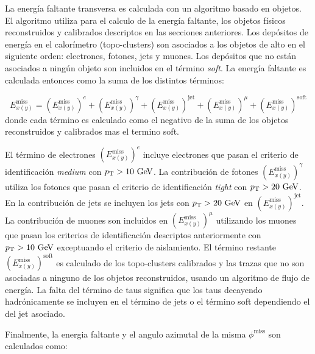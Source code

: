 La energía faltante transversa es calculada con un algoritmo basado en objetos.
El algoritmo utiliza para el calculo de la energía faltante, los objetos físicos
reconstruidos y calibrados descriptos en las secciones anteriores. Los depósitos
de energía en el calorímetro (topo-clusters) son asociados a los objetos de alto
{\pt} en el siguiente orden: electrones, fotones, jets y muones. Los depósitos
que no están asociados a ningún objeto son incluidos en el término \emph{soft}.
La energía faltante es calculada entonces como la suma de los distintos
términos:

\begin{equation}
  E^{\mathrm{miss}}_{x(y)} = (E^{\mathrm{miss}}_{x(y)})^e + (E^{\mathrm{miss}}_{x(y)})^\gamma + (E^{\mathrm{miss}}_{x(y)})^{\text{jet}} + (E^{\mathrm{miss}}_{x(y)})^{\mu} + (E^{\mathrm{miss}}_{x(y)})^{\mathrm{soft}}
\end{equation}
%
donde cada término es calculado como el negativo de la suma de los objetos reconstruidos y
calibrados mas el termino soft.

El término de electrones $(E^{\mathrm{miss}}_{x(y)})^e$ incluye electrones que
pasan el criterio de identificación \emph{medium} con $\pt>10\gev$. La
contribución de fotones $(E^{\mathrm{miss}}_{x(y)})^{\gamma}$ utiliza los
fotones que pasan el criterio de identificación \emph{tight} con $\pt>20\gev$.
En la contribución de jets se incluyen los jets con $\pt>20\gev$ en
$(E^{\mathrm{miss}}_{x(y)})^{\text{jet}}$. La contribución de muones son
incluidos en $(E^{\mathrm{miss}}_{x(y)})^{\mu}$ utilizando los muones que pasan
los criterios de identificación descriptos anteriormente con $\pt>10\gev$
exceptuando el criterio de aislamiento. El término restante
$(E^{\mathrm{miss}}_{x(y)})^{\mathrm{soft}}$ es calculado de los topo-clusters
calibrados y las trazas que no son asociadas a ninguno de los objetos
reconstruidos, usando un algoritmo de flujo de energía.
La falta del término de taus significa que los taus decayendo hadrónicamente se
incluyen en el término de jets o el término soft dependiendo el {\pt} del jet
asociado.


Finalmente, la energia faltante {\met} y el angulo azimutal de la misma
$\phi^\mathrm{miss}$ son calculados como:

